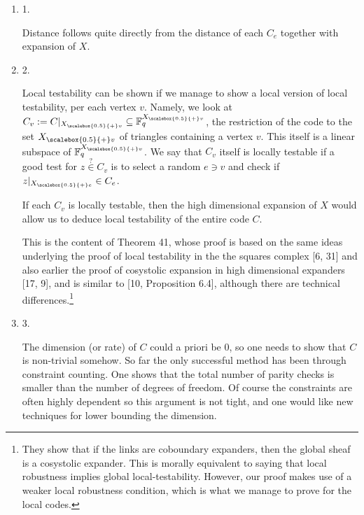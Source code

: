 \documentclass[10pt,a4paper]{article}
\begin{document}
\begin{enumerate}


\item[] 
1. 


Distance follows quite directly from the distance of each $C_{e}$ together with expansion of $X$.\par





\item[] 
2. 


Local testability can be shown if we manage to show a local version of local testability, per each vertex $v$. Namely, we look at $C_{v}:=C|_{{X}_{\scalebox{0.5}{+}v}}\subseteq\mathbb{F}_{q}^{{X}_{\scalebox{0.5}{+}v}}$, the restriction of the code to the set ${X}_{\scalebox{0.5}{+}v}$ of triangles containing a vertex $v$. This itself is a linear subspace of $\mathbb{F}_{q}^{{X}_{\scalebox{0.5}{+}v}}$. We say that $C_{v}$ itself is locally testable if a good test for $z\stackrel{{\scriptstyle?}}{{\in}}C_{v}$ is to select a random $e\ni v$ and check if $z|_{{X}_{\scalebox{0.5}{+}e}}\in C_{e}$.\par




If each $C_{v}$ is locally testable, then the high dimensional expansion of $X$ would allow us to deduce local testability of the entire code $C$.\par




This is the content of Theorem 41, whose proof is based on the same ideas underlying the proof of local testability in the the squares complex [6, 31] and also earlier the proof of cosystolic expansion in high dimensional expanders [17, 9], and is similar to [10, Proposition 6.4], although there are technical differences.\footnote{They show that if the links are coboundary expanders, then the global sheaf is a cosystolic expander. This is morally equivalent to saying that local robustness implies global local-testability. However, our proof makes use of a weaker local robustness condition, which is what we manage to prove for the local codes.}\par





\item[] 
3. 


The dimension (or rate) of $C$ could a priori be $0$, so one needs to show that $C$ is non-trivial somehow. So far the only successful method has been through constraint counting. One shows that the total number of parity checks is smaller than the number of degrees of freedom. Of course the constraints are often highly dependent so this argument is not tight, and one would like new techniques for lower bounding the dimension.\par





\end{enumerate}
\end{document}
